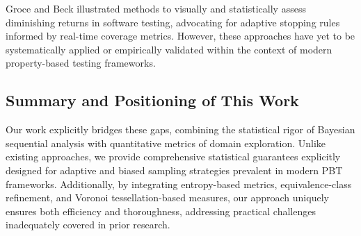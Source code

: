 Groce and Beck \cite{Groce2017} illustrated methods to visually and statistically assess diminishing returns in software testing, advocating for adaptive stopping rules informed by real-time coverage metrics. However, these approaches have yet to be systematically applied or empirically validated within the context of modern property-based testing frameworks.

\subsection{Summary and Positioning of This Work}
Our work explicitly bridges these gaps, combining the statistical rigor of Bayesian sequential analysis with quantitative metrics of domain exploration. Unlike existing approaches, we provide comprehensive statistical guarantees explicitly designed for adaptive and biased sampling strategies prevalent in modern PBT frameworks. Additionally, by integrating entropy-based metrics, equivalence-class refinement, and Voronoi tessellation-based measures, our approach uniquely ensures both efficiency and thoroughness, addressing practical challenges inadequately covered in prior research.